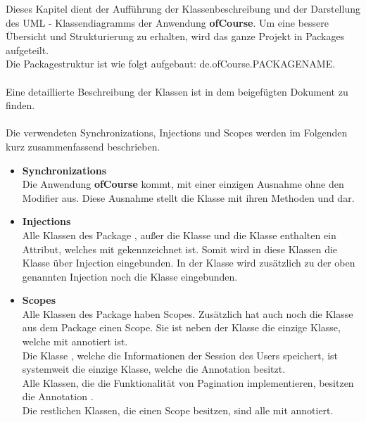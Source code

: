 	Dieses Kapitel dient der Aufführung der Klassenbeschreibung und der Darstellung des UML - Klassendiagramms der Anwendung \textbf{ofCourse}.
	Um eine bessere Übersicht und Strukturierung zu erhalten, wird das ganze Projekt in Packages aufgeteilt.\\
	Die Packagestruktur ist wie folgt aufgebaut: de.ofCourse.PACKAGENAME.\\
	\ \\
	Eine detaillierte Beschreibung der Klassen ist in dem beigefügten Dokument  zu finden.\\
	\ \\
	Die verwendeten Synchronizations, Injections und Scopes werden im Folgenden kurz zusammenfassend
	beschrieben.\\
	\begin{itemize}
		\item \textbf{Synchronizations}\\
		Die Anwendung \textbf{ofCourse} kommt, mit einer einzigen Ausnahme ohne den Modifier  aus. Diese Ausnahme stellt die Klasse  mit ihren Methoden   und  dar.
		\item \textbf{Injections}\\
		Alle Klassen des Package , außer die Klasse  und die Klasse
		  enthalten ein  Attribut, welches mit  gekennzeichnet
		ist. Somit wird in diese Klassen die  Klasse
		über Injection eingebunden.
		In der Klasse  wird zusätzlich zu der oben genannten Injection noch die Klasse 
		eingebunden.
		\item \textbf{Scopes} \\
		Alle Klassen des Package  haben Scopes. Zusätzlich hat auch noch die Klasse  aus dem Package  einen Scope. Sie ist neben der Klasse  die einzige Klasse, welche mit  annotiert ist.\\ Die Klasse , welche die Informationen der Session des Users speichert, ist systemweit die einzige Klasse, welche die Annotation   besitzt.\\ Alle Klassen, die die Funktionalität von Pagination implementieren, besitzen die Annotation .\\ Die restlichen Klassen, die einen Scope besitzen, sind alle mit  annotiert.
	\end{itemize}
	
